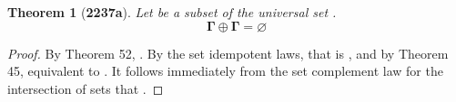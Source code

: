 \documentclass[preview]{standalone}
\newtheorem{theorem}{Theorem}
\begin{document}
\begin{theorem}[\textbf{2237a}]
    Let \bm{$\Gamma$} be a subset of the universal set \bm{$\Omega$}. 
    \begin{equation*}
        \bm{\Gamma \oplus \Gamma = \varnothing}
    \end{equation*}
\end{theorem}
\begin{proof}
    By Theorem 52, 
    \bm{$
    \Gamma \oplus \Gamma 
        = 
    \big \langle \Gamma \cup \Gamma \big \rangle
        - 
    \big \langle \Gamma \cap \Gamma \big \rangle
    $}. 
    By the set idempotent laws, 
    that is \bm{$\Gamma - \Gamma$}, 
    and by Theorem 45, equivalent to 
    \bm{$\Gamma \cap \overline{\Gamma}$}. 
    It follows immediately from the set complement law for the intersection of sets that 
    \bm{$\Gamma \oplus \Gamma = \varnothing$}.
\end{proof}
\end{document}
